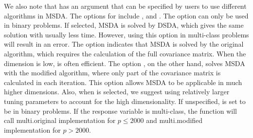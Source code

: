 We also note that  has an argument  that can be specified by users to use different algorithms in MSDA. The options for  include  ,  and . The option  can only be used in binary problems. If selected, MSDA is solved by DSDA, which gives the same solution with usually less time. However, using this option in multi-class problems will result in an error. The option  indicates that MSDA is solved by the original algorithm, which requires the calculation of the full covariance matrix. When the dimension is low,  is often efficient. The option , on the other hand, solves MSDA with the modified algorithm, where only part of the covariance matrix is calculated in each iteration. This option allows MSDA to be applicable in much higher dimensions. Also, when  is selected, we suggest using relatively larger tuning parameters to account for the high dimensionality. If unspecified,  is set to be  in binary problems. If the response variable is multi-class, the function will call multi.original implementation for $p\leq2000$ and multi.modified implementation for $p>2000$. 


%
%
%
%


